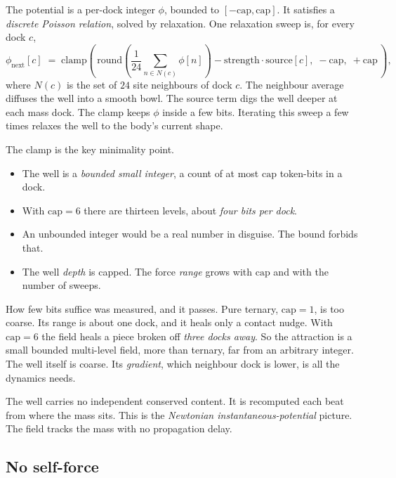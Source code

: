 The potential is a per-dock integer $\phi$, bounded to $[-\mathrm{cap}, \mathrm{cap}]$. It satisfies a \emph{discrete Poisson relation}, solved by relaxation. One relaxation sweep is, for every dock $c$,
\[
\phi_{\text{next}}[c] \;=\; \mathrm{clamp}\!\left(\, \mathrm{round}\!\left( \frac{1}{24}\sum_{n \in N(c)} \phi[n] \right) - \mathrm{strength}\cdot \mathrm{source}[c],\; -\mathrm{cap},\; +\mathrm{cap} \,\right),
\]
where $N(c)$ is the set of $24$ site neighbours of dock $c$. The neighbour average diffuses the well into a smooth bowl. The source term digs the well deeper at each mass dock. The clamp keeps $\phi$ inside a few bits. Iterating this sweep a few times relaxes the well to the body's current shape.

The clamp is the key minimality point.

\begin{itemize}
\item The well is a \emph{bounded small integer}, a count of at most $\mathrm{cap}$ token-bits in a dock.
\item With $\mathrm{cap} = 6$ there are thirteen levels, about \emph{four bits per dock}.
\item An unbounded integer would be a real number in disguise. The bound forbids that.
\item The well \emph{depth} is capped. The force \emph{range} grows with $\mathrm{cap}$ and with the number of sweeps.
\end{itemize}

How few bits suffice was measured, and it passes. Pure ternary, $\mathrm{cap} = 1$, is too coarse. Its range is about one dock, and it heals only a contact nudge. With $\mathrm{cap} = 6$ the field heals a piece broken off \emph{three docks away}. So the attraction is a small bounded multi-level field, more than ternary, far from an arbitrary integer. The well itself is coarse. Its \emph{gradient}, which neighbour dock is lower, is all the dynamics needs.

\begin{result}
The well carries no independent conserved content. It is recomputed each beat from where the mass sits. This is the \emph{Newtonian instantaneous-potential} picture. The field tracks the mass with no propagation delay.
\end{result}

\subsection{No self-force}

